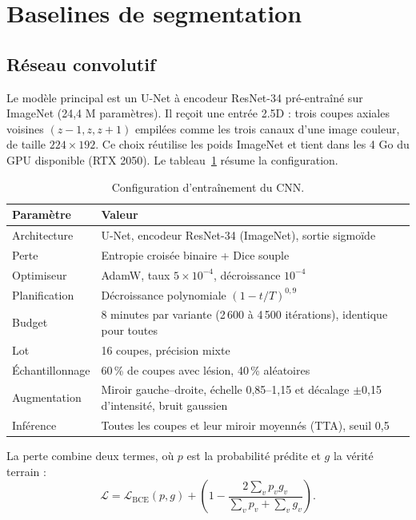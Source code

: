 \documentclass[11pt,a4paper]{report}
\begin{document}
\section{Baselines de segmentation}

\subsection{Réseau convolutif}

Le modèle principal est un U-Net à encodeur ResNet-34 pré-entraîné sur
ImageNet (24,4 M paramètres). Il reçoit une entrée 2.5D : trois coupes
axiales voisines $(z-1, z, z+1)$ empilées comme les trois canaux d'une image
couleur, de taille $224 \times 192$. Ce choix réutilise les poids ImageNet et
tient dans les 4 Go du GPU disponible (RTX 2050). Le tableau~\ref{tab:cnn}
résume la configuration.

\begin{table}[H]
  \centering
  \caption{Configuration d'entraînement du CNN.}
  \label{tab:cnn}
  \begin{tabularx}{\textwidth}{lX}
    \toprule
    \textbf{Paramètre} & \textbf{Valeur} \\
    \midrule
    Architecture    & U-Net, encodeur ResNet-34 (ImageNet), sortie sigmoïde \\
    Perte           & Entropie croisée binaire + Dice souple \\
    Optimiseur      & AdamW, taux $5 \times 10^{-4}$, décroissance $10^{-4}$ \\
    Planification   & Décroissance polynomiale $(1 - t/T)^{0,9}$ \\
    Budget          & 8 minutes par variante (2\,600 à 4\,500 itérations), identique pour toutes \\
    Lot             & 16 coupes, précision mixte \\
    Échantillonnage & 60\,\% de coupes avec lésion, 40\,\% aléatoires \\
    Augmentation    & Miroir gauche--droite, échelle 0,85--1,15 et décalage $\pm$0,15 d'intensité, bruit gaussien \\
    Inférence       & Toutes les coupes et leur miroir moyennés (TTA), seuil 0,5 \\
    \bottomrule
  \end{tabularx}
\end{table}

La perte combine deux termes, où $p$ est la probabilité prédite et $g$ la
vérité terrain :
\begin{equation}
  \mathcal{L} = \mathcal{L}_{\text{BCE}}(p, g)
  + \left(1 - \frac{2\sum_v p_v g_v}{\sum_v p_v + \sum_v g_v}\right).
\end{equation}
\end{document}
